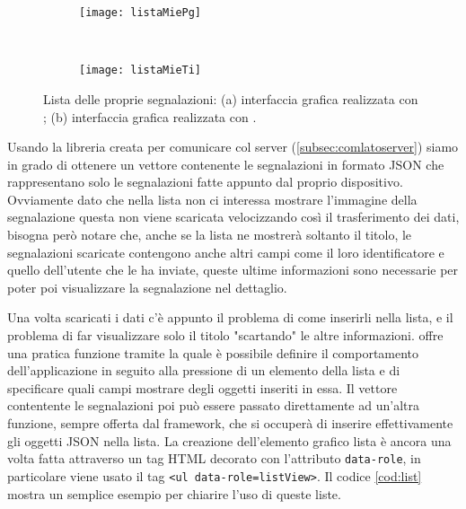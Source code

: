             \begin{figure}[H]
              \centering
              \begin{subfigure}[b]{0.485\textwidth}
                \texttt{[image: listaMiePg]}
                \caption{}
              \end{subfigure}
              ~
              \begin{subfigure}[b]{0.485\textwidth}
                \texttt{[image: listaMieTi]}
                \caption{}
              \end{subfigure}
              \caption{Lista delle  proprie segnalazioni:
                (a) interfaccia grafica realizzata con \kendomob{};
                (b) interfaccia grafica realizzata con \tisdk{}.
                }
              \label{fig:mieTiPg}
            \end{figure}

            \noindent Usando la libreria creata per comunicare col server (\ref{subsec:comlatoserver})
            siamo in grado di ottenere un vettore contenente le segnalazioni in formato JSON che
            rappresentano solo le segnalazioni fatte appunto dal proprio dispositivo.
            Ovviamente dato che nella lista non ci interessa mostrare l'immagine della segnalazione
            questa non viene scaricata velocizzando così il
            trasferimento dei dati, bisogna però notare che, anche se la lista
            ne mostrerà soltanto il titolo, le segnalazioni scaricate contengono
            anche altri campi come il loro identificatore e quello dell'utente
            che le ha inviate, queste ultime informazioni sono necessarie per
            poter poi visualizzare la segnalazione nel dettaglio.

            Una volta scaricati i dati c'è appunto il problema di come inserirli
            nella lista, e il problema di far visualizzare solo il titolo
            "scartando" le altre informazioni.
            \kendomob{} offre una pratica funzione \js{} tramite la quale è
            possibile definire il comportamento dell'applicazione in seguito
            alla pressione di un elemento della lista e di specificare quali
            campi mostrare degli oggetti inseriti in essa. Il vettore contentente le segnalazioni
            poi può essere passato direttamente ad un'altra funzione,
            sempre offerta dal framework, che si occuperà di inserire effettivamente
            gli oggetti JSON nella lista.
            La creazione dell'elemento grafico lista è ancora una volta fatta
            attraverso un tag HTML decorato con l'attributo \texttt{data-role},
            in particolare viene usato il tag \texttt{<ul data-role=listView>}.
            Il codice \ref{cod:list} mostra un semplice esempio per
            chiarire l'uso di queste liste.


